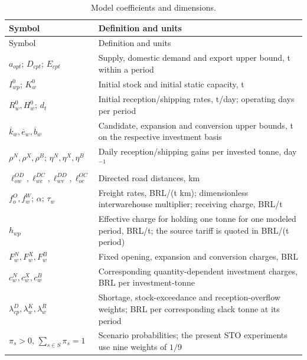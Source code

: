 \documentclass[
  english,
  11pt,
  a4paper,
  authoryear,
  preprint]{elsarticle}
\begin{document}
\begin{longtable}[]{@{}
  >{\raggedright\arraybackslash}p{}
  >{\raggedright\arraybackslash}p{}@{}}
\caption{Model coefficients and
dimensions.}\label{tbl-parameters}\tabularnewline
\toprule\noalign{}
\begin{minipage}[b]{\linewidth}\raggedright
Symbol
\end{minipage} & \begin{minipage}[b]{\linewidth}\raggedright
Definition and units
\end{minipage} \\
\midrule\noalign{}
\endfirsthead
\toprule\noalign{}
\begin{minipage}[b]{\linewidth}\raggedright
Symbol
\end{minipage} & \begin{minipage}[b]{\linewidth}\raggedright
Definition and units
\end{minipage} \\
\midrule\noalign{}
\endhead
\bottomrule\noalign{}
\endlastfoot
\(a_{opt}\); \(D_{cpt}\); \(E_{cpt}\) & Supply, domestic demand and
export upper bound, t within a period \\
\(I^0_{wp}\); \(K^0_w\) & Initial stock and initial static capacity,
t \\
\(R^0_w,H^0_w\); \(d_t\) & Initial reception/shipping rates, t/day;
operating days per period \\
\(\overline k_w,\overline e_w,\overline b_w\) & Candidate, expansion and
conversion upper bounds, t on the respective investment basis \\
\(\rho^N,\rho^X,\rho^B\); \(\eta^N,\eta^X,\eta^B\) & Daily
reception/shipping gains per invested tonne, day\(^{-1}\) \\
\(\ell^{OD}_{ow},\ell^{DC}_{wc},\ell^{DD}_{wv},\ell^{OC}_{oc}\) &
Directed road distances, km \\
\(f^O_o,f^W_w\); \(\alpha\); \(\tau_w\) & Freight rates, BRL/(t km);
dimensionless interwarehouse multiplier; receiving charge, BRL/t \\
\(h_{wp}\) & Effective charge for holding one tonne for one modeled
period, BRL/t; the source tariff is quoted in BRL/(t period) \\
\(F^N_w,F^X_w,F^B_w\) & Fixed opening, expansion and conversion charges,
BRL \\
\(c^N_w,c^X_w,c^B_w\) & Corresponding quantity-dependent investment
charges, BRL per investment-tonne \\
\(\lambda^D_{cp},\lambda^K_w,\lambda^R_w\) & Shortage, stock-exceedance
and reception-overflow weights; BRL per corresponding slack tonne at its
period \\
\(\pi_s>0\), \(\sum_{s\in S}\pi_s=1\) & Scenario probabilities; the
present STO experiments use nine weights of \(1/9\) \\
\end{longtable}
\end{document}
